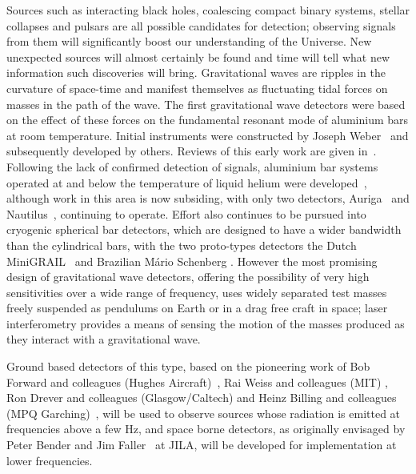 \documentclass{article}
\begin{document}
Sources such as interacting black holes, coalescing compact binary systems,
stellar collapses and pulsars are all possible candidates for detection;
observing signals from them will significantly boost our understanding of the
Universe. New unexpected sources will almost certainly be found and time will
tell what new information such discoveries will bring. Gravitational waves are
ripples in the curvature of space-time and manifest themselves as fluctuating
tidal forces on masses in the path of the wave. The first gravitational wave
detectors were based on the effect of these forces on the fundamental resonant
mode of aluminium bars at room temperature. Initial instruments were constructed
by Joseph Weber~\cite{Weber1, Weber2} and subsequently developed by others.
Reviews of this early work are given in~\cite{Tyson, Douglass}. Following the
lack of confirmed detection of signals, aluminium bar systems operated at and
below the temperature of liquid helium were developed~\cite{Astone, Prodi,
Amaldi, Heng},
although work in this area is now subsiding, with only two detectors, Auriga~\cite{AURIGA} and Nautilus~\cite{NAUTILUS}, continuing to operate. Effort also continues to be pursued into cryogenic spherical bar detectors,
which are designed to have a wider bandwidth than the cylindrical bars, with the
two proto-types detectors the Dutch MiniGRAIL~\cite{MiniGRAIL, Gottardi:2007}
and Brazilian M\'{a}rio Schenberg \cite{Schenberg, Aguiar:2006}. However the
most promising design of gravitational wave detectors, offering the possibility
of very high sensitivities over a wide range of frequency, uses widely separated
test masses freely suspended as pendulums on Earth or in a drag free craft in
space; laser interferometry provides a means of sensing the motion of the masses
produced as they interact with a gravitational wave.

Ground based detectors of this type, based on the pioneering work of Bob Forward
and colleagues (Hughes Aircraft)~\cite{Forward}, Rai Weiss and colleagues (MIT)
\cite{Weiss}, Ron Drever and colleagues (Glasgow/Caltech) \cite{Drever1,
Drever2} and Heinz Billing and colleagues (MPQ Garching)~\cite{Billing}, will be
used to observe sources whose radiation is emitted at frequencies above a few
Hz, and space borne detectors, as originally envisaged by Peter Bender and Jim
Faller~\cite{BenderFaller1, BenderFaller2} at JILA, will be developed for
implementation at lower frequencies.
\end{document}
